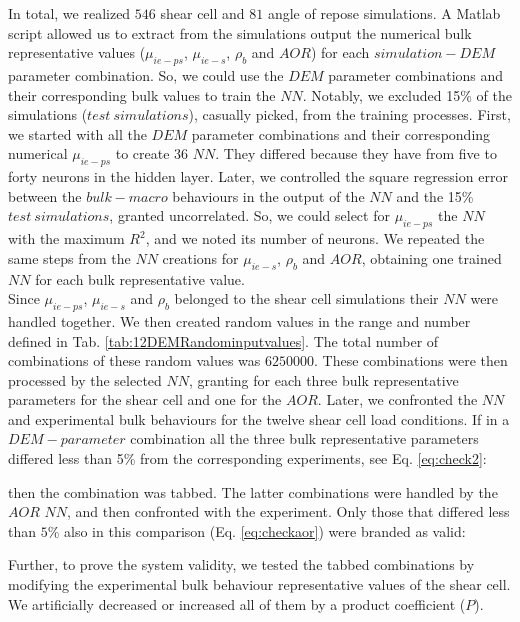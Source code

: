In total, we realized $546$ shear cell and $81$ angle of repose simulations.
A Matlab script allowed us to extract from the simulations output the numerical
bulk representative values ($\mu_{ie-ps}$, $\mu_{ie-s}$, $\rho_b$ and $AOR$) for each $simulation-DEM$ parameter combination. 
So, we could use the $DEM$ parameter combinations and their corresponding bulk values to train the $NN$. 
Notably, we excluded 15\% of the simulations ($test ~ simulations$), casually
picked, from the training processes.
First, we started with all the $DEM$ parameter combinations and their corresponding numerical $\mu_{ie-ps}$ to create 36 $NN$. 
They differed because they have from five to forty neurons in the hidden layer. 
Later, we controlled the square regression error between the $bulk-macro$ behaviours in the output of 
the $NN$ and the 15\% $test ~ simulations$, granted uncorrelated. 
So, we could select for $\mu_{ie-ps}$ the $NN$ with the maximum $R^2$, and we noted its number of neurons. 
We repeated the same steps from the $NN$ creations for $\mu_{ie-s}$, $\rho_b$ and $AOR$, 
obtaining one trained $NN$ for each bulk representative value. \\
% 
Since $\mu_{ie-ps}$, $\mu_{ie-s}$ and $\rho_b$ belonged to the shear cell
simulations their $NN$ were handled together. We then created random values in the range
and number defined in Tab. \ref{tab:12DEMRandominputvalues}.
The total number of combinations of these random values was $6250000$. These
combinations were then processed by the selected $NN$, granting for each three bulk representative parameters for the shear cell and one for the $AOR$. Later, we confronted the $NN$ and experimental bulk behaviours for the twelve shear cell load conditions. 
If in a $DEM-parameter$ combination all the three bulk representative parameters differed less 
than 5\% from the corresponding experiments, see Eq. \ref{eq:check2}:

then the combination was tabbed. The latter combinations were handled by the $AOR$ $NN$, and then confronted with the experiment. 
Only those that differed less than $5\%$ also in this comparison (Eq.
\ref{eq:checkaor}) were branded as valid:

Further, to prove the system validity, we tested the tabbed combinations by modifying the experimental bulk
behaviour representative values of the shear cell. 
We artificially decreased or increased all of them by a product coefficient ($P$).






